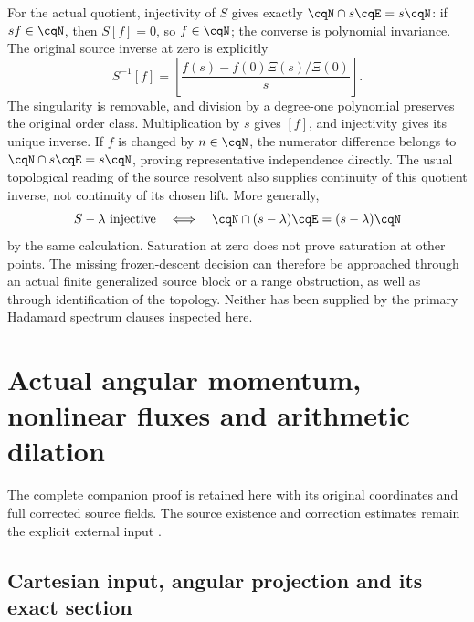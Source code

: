 For the actual quotient, injectivity of $S$ gives exactly
$\cqN\cap s\cqE=s\cqN$: if $sf\in\cqN$, then
$S[f]=0$, so $f\in\cqN$; the converse is polynomial invariance.
The original source inverse at zero is explicitly
\begin{equation}
 S^{-1}[f]=\left[
 \frac{f(s)-f(0)\Xi(s)/\Xi(0)}{s}\right].
 \label{eq:cq-source-explicit-zero-resolvent}
\end{equation}
The singularity is removable, and division by a degree-one
polynomial preserves the original order class. Multiplication
by $s$ gives $[f]$, and injectivity gives its unique inverse.
If $f$ is changed by $n\in\cqN$, the numerator difference
belongs to $\cqN\cap s\cqE=s\cqN$, proving representative
independence directly. The usual topological reading of
the source resolvent also supplies continuity of this
quotient inverse, not continuity of its chosen lift.
More generally,
\[
 S-\lambda\text{ injective}\quad\Longleftrightarrow\quad
 \cqN\cap(s-\lambda)\cqE=(s-\lambda)\cqN
\]
by the same calculation. Saturation at zero does not prove
saturation at other points.
The missing frozen-descent decision can therefore be
approached through an actual finite generalized source block
or a range obstruction, as well as through identification
of the topology. Neither has been supplied by the primary
Hadamard spectrum clauses inspected here.

\section{Actual angular momentum, nonlinear fluxes and arithmetic dilation}
\label{sec:cq-angular-physical-map}

The complete companion proof \cite{cqNSAngular} is retained here with its original coordinates and full corrected source fields. The source existence and correction estimates remain the explicit external input \cite{cqNS2026}.

\subsection{Cartesian input, angular projection and its exact section}


